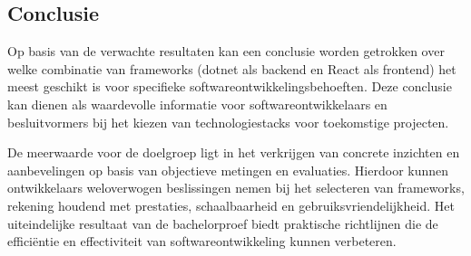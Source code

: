 \documentclass{hogent-article}
\begin{document}
\subsection{Conclusie}
Op basis van de verwachte resultaten kan een conclusie worden getrokken over welke combinatie van frameworks (dotnet als backend en React als frontend) het meest geschikt is voor specifieke softwareontwikkelingsbehoeften. Deze conclusie kan dienen als waardevolle informatie voor softwareontwikkelaars en besluitvormers bij het kiezen van technologiestacks voor toekomstige projecten.

De meerwaarde voor de doelgroep ligt in het verkrijgen van concrete inzichten en aanbevelingen op basis van objectieve metingen en evaluaties. Hierdoor kunnen ontwikkelaars weloverwogen beslissingen nemen bij het selecteren van frameworks, rekening houdend met prestaties, schaalbaarheid en gebruiksvriendelijkheid. Het uiteindelijke resultaat van de bachelorproef biedt praktische richtlijnen die de efficiëntie en effectiviteit van softwareontwikkeling kunnen verbeteren.
\printbibliography[heading=bibintoc]
\end{document}
